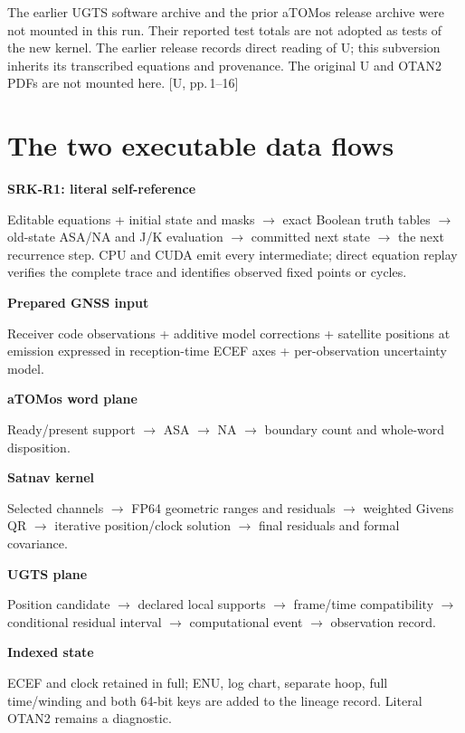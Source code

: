 \documentclass[11pt,a4paper]{article}
\newcommand{\src}[1]{\textcolor{muted}{[U, #1]}}
\begin{document}
The earlier UGTS software archive and the prior aTOMos release archive were not mounted
in this run. Their reported test totals are not adopted as tests of the new kernel.
The earlier release records direct reading of U; this subversion inherits its
transcribed equations and provenance. The original U and OTAN2 PDFs are not mounted
here. \src{pp.\,1--16}
\clearpage

\section*{The two executable data flows}
\begin{panel}
\textbf{SRK-R1: literal self-reference}\par
Editable equations + initial state and masks $\to$ exact Boolean truth tables
$\to$ old-state ASA/NA and J/K evaluation $\to$ committed next state $\to$
the next recurrence step. CPU and CUDA emit every intermediate; direct equation
replay verifies the complete trace and identifies observed fixed points or cycles.
\end{panel}
\begin{panel}
\textbf{Prepared GNSS input}\par
Receiver code observations + additive model corrections + satellite positions at
emission expressed in reception-time ECEF axes + per-observation uncertainty model.\par
\textbf{aTOMos word plane}\par
Ready/present support $\to$ ASA $\to$ NA $\to$ boundary count and whole-word disposition.\par
\textbf{Satnav kernel}\par
Selected channels $\to$ FP64 geometric ranges and residuals $\to$ weighted Givens QR
$\to$ iterative position/clock solution $\to$ final residuals and formal covariance.\par
\textbf{UGTS plane}\par
Position candidate $\to$ declared local supports $\to$ frame/time compatibility
$\to$ conditional residual interval $\to$ computational event $\to$ observation record.\par
\textbf{Indexed state}\par
ECEF and clock retained in full; ENU, log chart, separate hoop, full time/winding and
both 64-bit keys are added to the lineage record. Literal OTAN2 remains a diagnostic.
\end{panel}
\end{document}
